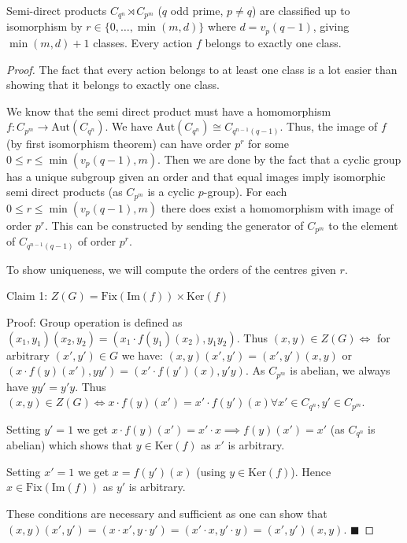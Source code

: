 \documentclass[a4paper,11pt, titlepage]{article}
\theoremstyle{remark}
\begin{document}
\begin{theorem}\label{Classification of semi-direct products between Cyclic p-group and q-groups}
    Semi-direct products $C_{q^n} \rtimes C_{p^m}$ ($q$ odd prime, $p \neq q$) are classified up to isomorphism by $r \in \{0, …, \min(m, d)\}$ where $d = v_p(q - 1)$, giving $\min(m, d) + 1$ classes. Every action $f$ belongs to exactly one class.
\end{theorem}
\begin{proof}
    The fact that every action belongs to at least one class is a lot easier than showing that it belongs to exactly one class.

    We know that the semi direct product must have a homomorphism $f : C_{p^m} \rightarrow \text{Aut}(C_{q^n})$. We have $\text{Aut}(C_{q^n}) \cong C_{q^{n-1}(q - 1)}$. Thus, the image of $f$ (by first isomorphism theorem) can have order $p^r$ for some $0 \leq r \leq \min(v_p(q-1), m)$. Then we are done by the fact that a cyclic group has a unique subgroup given an order and that equal images imply isomorphic semi direct products (as $C_{p^m}$ is a cyclic $p$-group). For each $0 \leq r \leq \min(v_p(q-1), m)$ there does exist a homomorphism with image of order $p^r$. This can be constructed by sending the generator of $C_{p^m}$ to the element of $C_{q^{n-1}(q-1)}$ of order $p^r$.

    To show uniqueness, we will compute the orders of the centres given $r$.

    Claim 1: $Z(G) = \text{Fix}(\text{Im}(f)) \times \text{Ker}(f)$

    Proof: Group operation is defined as $(x_1, y_1)(x_2, y_2) = (x_1 \cdot f(y_1)(x_2), y_1y_2)$. Thus $(x, y) \in Z(G) \iff$ for arbitrary $(x', y') \in G$ we have: $(x, y)(x', y') = (x', y')(x, y)$ or $(x \cdot f(y)(x'), yy') = (x' \cdot f(y')(x), y'y)$. As $C_{p^m}$ is abelian, we always have $yy' = y'y$. Thus $(x, y) \in Z(G) \iff x \cdot f(y)(x') = x' \cdot f(y')(x) \forall x' \in C_{q^n}, y' \in C_{p^m}$. 
    
    Setting $y' = 1$ we get $x \cdot f(y)(x') = x' \cdot x \implies f(y)(x') = x'$ (as $C_{q^n}$ is abelian) which shows that $y \in \text{Ker}(f)$ as $x'$ is arbitrary.

    Setting $x' = 1$ we get $x = f(y')(x)$ (using $y \in \text{Ker}(f)$). Hence $x \in \text{Fix}(\text{Im}(f))$ as $y'$ is arbitrary.

    These conditions are necessary and sufficient as one can show that $(x, y)(x', y') = (x \cdot x', y \cdot y') = (x' \cdot x, y' \cdot y) = (x', y') (x, y)$. $\blacksquare$


\end{proof}
\end{document}
